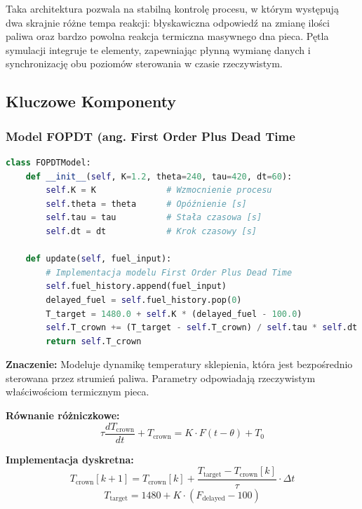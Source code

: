 \documentclass[12pt,a4paper]{article}
\begin{document}
Taka architektura pozwala na stabilną kontrolę procesu, w którym występują dwa skrajnie różne tempa reakcji: błyskawiczna odpowiedź na zmianę ilości paliwa oraz bardzo powolna reakcja termiczna masywnego dna pieca. Pętla symulacji integruje te elementy, zapewniając płynną wymianę danych i synchronizację obu poziomów sterowania w czasie rzeczywistym.



\subsection{Kluczowe Komponenty}

\subsubsection{Model FOPDT  (ang. First Order Plus Dead Time}

\begin{lstlisting}[language=Python, caption={Klasa FOPDTModel}]
class FOPDTModel:
    def __init__(self, K=1.2, theta=240, tau=420, dt=60):
        self.K = K              # Wzmocnienie procesu
        self.theta = theta      # Opóźnienie [s]
        self.tau = tau          # Stała czasowa [s]
        self.dt = dt            # Krok czasowy [s]
        
    def update(self, fuel_input):
        # Implementacja modelu First Order Plus Dead Time
        self.fuel_history.append(fuel_input)
        delayed_fuel = self.fuel_history.pop(0)
        T_target = 1480.0 + self.K * (delayed_fuel - 100.0)
        self.T_crown += (T_target - self.T_crown) / self.tau * self.dt
        return self.T_crown
\end{lstlisting}

\textbf{Znaczenie:} Modeluje dynamikę temperatury sklepienia, która jest bezpośrednio sterowana przez strumień paliwa. Parametry odpowiadają rzeczywistym właściwościom termicznym pieca.

\textbf{Równanie różniczkowe:}
\begin{equation}
    \tau \frac{dT_{\text{crown}}}{dt} + T_{\text{crown}} = K \cdot F(t-\theta) + T_0
\end{equation}

\textbf{Implementacja dyskretna:}
\begin{equation}
    T_{\text{crown}}[k+1] = T_{\text{crown}}[k] + \frac{T_{\text{target}} - T_{\text{crown}}[k]}{\tau} \cdot \Delta t
\end{equation}
\begin{equation}
    T_{\text{target}} = 1480 + K \cdot (F_{\text{delayed}} - 100)
\end{equation}
\end{document}
